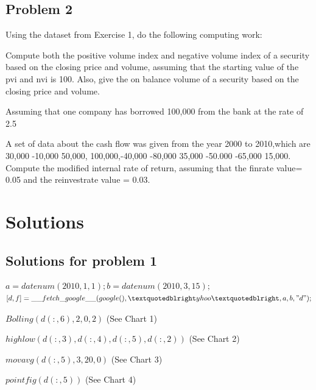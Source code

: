 \documentclass[11pt]{article}
\begin{document}
\subsection{Problem 2}
Using the dataset from Exercise 1, do the following computing work:
\begin{enumerate}[{[}1{]}]
\item Compute both the positive volume index and negative volume index of a security based on the closing price and volume, assuming that the starting value of the pvi and nvi is 100. Also, give the on balance volume of a security based on the closing price and volume.
\item Assuming that one company has borrowed 100,000 from the bank at the rate of 2.5%
\item A set of data about the cash flow was given from the year 2000 to 2010,which are 30,000 -10,000 50,000, 100,000,-40,000 -80,000 35,000 -50.000 -65,000 15,000. Compute the modified internal rate of return, assuming that the finrate value= 0.05 and the reinvestrate value = 0.03.
\end{enumerate}


\section{Solutions}
\subsection{Solutions for problem 1}
$a = datenum(2010,1,1);b = datenum(2010,3,15);$
\\$[d,f]= \_\_fetch\_google\_\_(google(), ”yhoo”, a, b, "d");$
\begin{enumerate}[{[}1{]}] 
\item $Bolling(d(:,6),2,0,2)$ (See Chart 1)
\item $highlow(d(:,3),d(:,4),d(:,5),d(:,2))$ (See Chart 2)
\item $movavg(d(:,5),3,20,0)$ (See Chart 3)
\item $pointfig(d(:,5))$ (See Chart 4)
\end{enumerate}
\end{document}
